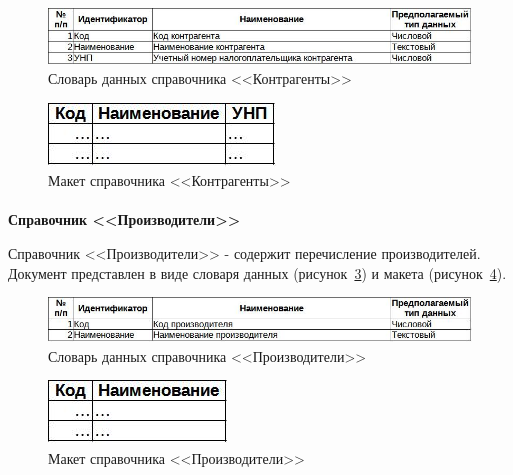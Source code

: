 \documentclass[12pt, a4paper, simple]{eskdtext}
\begin{document}
    \begin{figure}[!h]
        \centering
        \includegraphics[width=14cm]
            {_docs/СП_Контраг_типы.jpg}
        \caption{Словарь данных справочника <<Контрагенты>>}
        \label{fig:CP_Kontrag_tipi}
    \end{figure}

    \begin{figure}[!h]
        \centering
        \includegraphics[]
            {_docs/СП_Контраг_макет.jpg}
        \caption{Макет справочника <<Контрагенты>>}
        \label{fig:CP_Kontrag_maket}
    \end{figure}

    \paragraph{} \textbf{Справочник <<Производители>>}

    Справочник <<Производители>> - содержит перечисление производителей.
    Документ представлен в виде словаря данных (рисунок~\ref{fig:CP_Proizv_tipi})
    и макета (рисунок~\ref{fig:CP_Proizv_maket}).

    \begin{figure}[!h]
        \centering
        \includegraphics[width=14cm]
            {_docs/СП_Произв_типы.jpg}
        \caption{Словарь данных справочника <<Производители>>}
        \label{fig:CP_Proizv_tipi}
    \end{figure}

    \begin{figure}[!h]
        \centering
        \includegraphics[]
            {_docs/СП_Произв_макет.jpg}
        \caption{Макет справочника <<Производители>>}
        \label{fig:CP_Proizv_maket}
    \end{figure}
\end{document}
